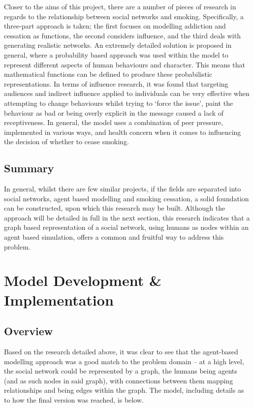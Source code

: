 \documentclass[]{report}
\begin{document}
Closer to the aims of this project, there are a number of pieces of research in regards to the relationship between social networks and smoking\cite{SmokOmni}. Specifically, a three-part approach is taken; the first focuses on modelling addiction and cessation as functions, the second considers influence, and the third deals with generating realistic networks. An extremely detailed solution is proposed in general, where a probability based approach was used within the model to represent different aspects of human behaviours and character\cite{SmokOmni-pap1}. This means that mathematical functions can be defined to produce these probabilistic representations. In terms of influence research, it was found that targeting audiences and indirect influence applied to individuals can be very effective when attempting to change behaviours whilst trying to `force the issue', paint the behaviour as bad or being overly explicit in the message caused a lack of receptiveness\cite{SmokOmni-pap2}. In general, the model uses a combination of peer pressure, implemented in various ways, and health concern when it comes to influencing the decision of whether to cease smoking\cite{SmokOmni-pap3}.

\section{Summary}
In general, whilst there are few similar projects, if the fields are separated into social networks, agent based modelling and smoking cessation, a solid foundation can be constructed, upon which this research may be built. Although the approach will be detailed in full in the next section, this research indicates that a graph based representation of a social network, using humans as nodes within an agent based simulation, offers a common and fruitful way to address this problem.

%
%

%
%
\chapter{Model Development \& Implementation}
\label{sec:dev}
\section{Overview}
Based on the research detailed above, it was clear to see that the agent-based modelling approach was a good match to the problem domain – at a high level, the social network could be represented by a graph, the humans being agents (and as such nodes in said graph), with connections between them mapping relationships and being edges within the graph. The model, including details as to how the final version was reached, is below.
\end{document}
